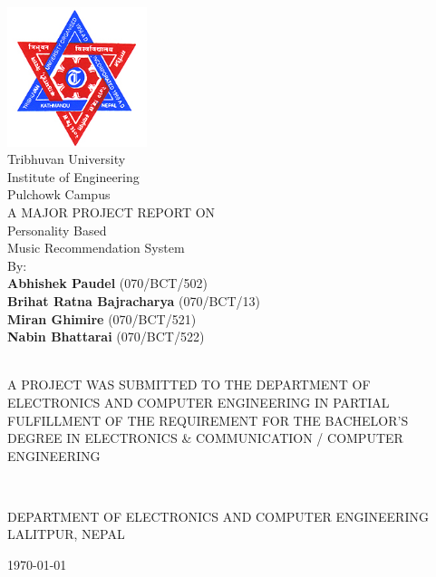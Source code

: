 

\thispagestyle{empty} %



{
  \thispagestyle{empty}
  \centering
  \normalsize

  \includegraphics[height=1.6in]{fig/tu-logo}\\
  {\Large\sc Tribhuvan University}\\
  {\Large\sc Institute of Engineering}\\
  Pulchowk Campus
  \\[1.5cm]

  A MAJOR PROJECT REPORT ON\\
  {\LARGE \sc Personality Based \\[5pt] Music Recommendation System}\\[1cm]

  By:\\
  {\bf Abhishek Paudel} (070/BCT/502)\\
  {\bf Brihat Ratna Bajracharya} (070/BCT/13)\\
  {\bf Miran Ghimire} (070/BCT/521)\\
	{\bf Nabin Bhattarai} (070/BCT/522)\\

  ~

  A PROJECT WAS SUBMITTED TO THE DEPARTMENT OF ELECTRONICS AND COMPUTER
  ENGINEERING IN PARTIAL FULFILLMENT OF THE REQUIREMENT FOR THE BACHELOR'S
  DEGREE IN ELECTRONICS \& COMMUNICATION / COMPUTER ENGINEERING

  ~

  DEPARTMENT OF ELECTRONICS AND COMPUTER ENGINEERING\\
  LALITPUR, NEPAL

  \vfill
  \large
	\today

}

